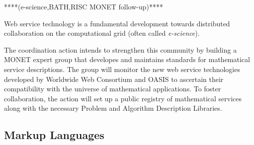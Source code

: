 \documentclass[draft]{artikel3}
\begin{document}
****(e-science,BATH,RISC MONET follow-up)****

Web service technology is a fundamental development towards
distributed collaboration on the computational grid (often called
\emph{e-science}).  



The coordination action intends to strengthen this community by
building a MONET expert group that developes and maintains standards
for mathematical service descriptions. The group will monitor the new
web service technologies developed by Worldwide Web Consortium and
OASIS to ascertain their compatibility with the universe of
mathematical applications. To foster collaboration, the action will
set up a public registry of mathematical services along with the
necessary Problem and Algorithm Description Libraries.










\subsection{Markup Languages}
\label{sec:ml}
\end{document}
